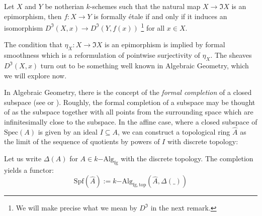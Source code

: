 \documentclass[9pt,twosided]{amsart}
\newcommand{\Spec}{\ensuremath{\mathrm{Spec}}}
\newcommand{\Spf}{\ensuremath{\mathrm{Spf}}}
\newcommand{\fgkAlg}{\ensuremath{k\mathrm{-Alg}_{\mathrm{fg}}}}
\newcommand{\fgkAlgTop}{\ensuremath{k\mathrm{-Alg}_{\mathrm{fg,top}}}}
\begin{document}
Let $X$ and $Y$ be notherian $k$-schemes such that the natural map $X\to \Im X$ is an epimorphism,
then $f:X\to Y$ is formally étale if and only if it induces an isomorphism $D^\Im(X,x)\to D^\Im(Y,f(x))$
\footnote{We will make precise what we mean by $D^\Im$ in the next remark. } for all $x\in X$.

The condition that $\eta_X:X\to \Im X$ is an epimorphism is implied by formal smoothness which is a reformulation of pointwise surjectivity of $\eta_X$.
The sheaves $D^\Im(X,x)$ turn out to be something well known in Algebraic Geometry, which we will explore now.

In Algebraic Geometry, there is the concept of the \emph{formal completion} of a closed subspace (see \cite[p.194]{hartshorne} or \cite[10.8]{ega}).
Roughly, the formal completion of a subspace may be thought of as the subspace together with
all points from the surrounding space which are infinitesimally close to the subspace.
In the affine case, where a closed subspace of $\Spec(A)$ is given by an ideal $I\subseteq A$, we can construct a topological ring $\hat{A}$
as the limit of the sequence of quotients by powers of $I$ with discrete topology:
\begin{center}
\end{center}
Let us write $\Delta(A)$ for $A\in\fgkAlg$ with the discrete topology.
The completion yields a functor:
\[ \Spf(\hat{A}) := \fgkAlgTop(\hat{A},\Delta(\_))\]
\end{document}
